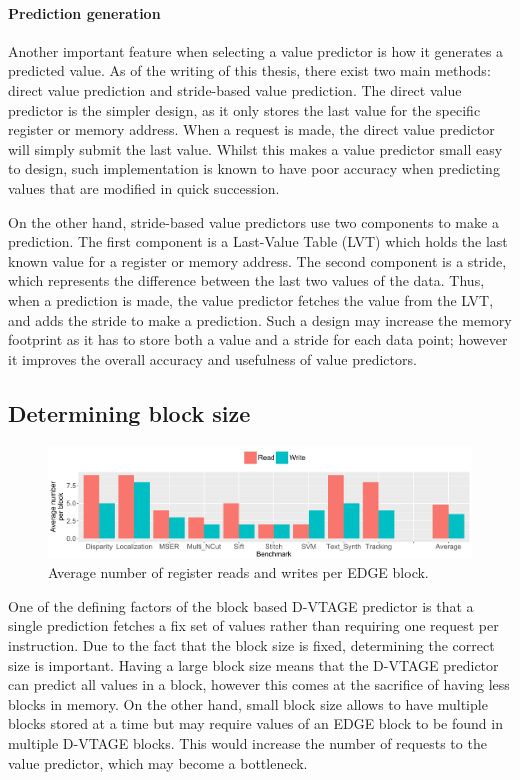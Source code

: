 \paragraph*{Prediction generation} Another important feature when selecting a value predictor is how it generates a predicted value.
As of the writing of this thesis, there exist two main methods: direct value prediction and stride-based value prediction.
The direct value predictor is the simpler design, as it only stores the last value for the specific register or memory address.
When a request is made, the direct value predictor will simply submit the last value.
Whilst this makes a value predictor small easy to design, such implementation is known to have poor accuracy when predicting values that are modified in quick succession.

On the other hand, stride-based value predictors use two components to make a prediction.
The first component is a Last-Value Table (LVT) which holds the last known value for a register or memory address.
The second component is a stride, which represents the difference between the last two values of the data.
Thus, when a prediction is made, the value predictor fetches the value from the LVT, and adds the stride to make a prediction.
Such a design may increase the memory footprint as it has to store both a value and a stride for each data point; however it improves the overall accuracy and usefulness of value predictors.

\subsection{Determining block size}

\begin{figure}[t]
    \centering
    \includegraphics[width=1\textwidth]{chapter3/graphics/averageRegRead.pdf}

    \caption{Average number of register reads and writes per EDGE block.}
    \label{fig:edge_reg_read}
	\vspace{1em}
\end{figure}

One of the defining factors of the block based D-VTAGE predictor is that a single prediction fetches a fix set of values rather than requiring one request per instruction.
Due to the fact that the block size is fixed, determining the correct size is important.
Having a large block size means that the D-VTAGE predictor can predict all values in a block, however this comes at the sacrifice of having less blocks in memory.
On the other hand, small block size allows to have multiple blocks stored at a time but may require values of an EDGE block to be found in multiple D-VTAGE blocks.
This would increase the number of requests to the value predictor, which may become a bottleneck.

